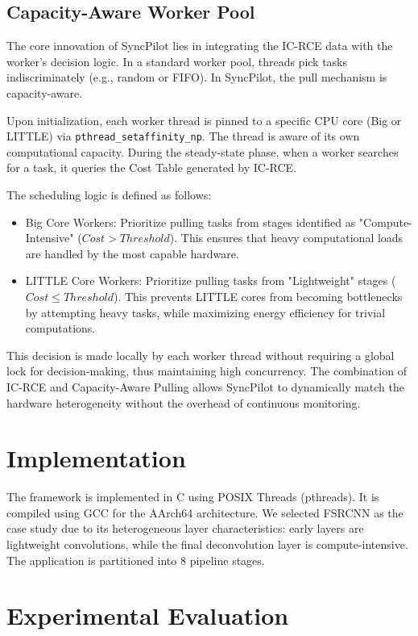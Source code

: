 \documentclass[conference]{IEEEtran}
\begin{document}
\subsection{Capacity-Aware Worker Pool}
The core innovation of SyncPilot lies in integrating the IC-RCE data with the worker's decision logic. In a standard worker pool, threads pick tasks indiscriminately (e.g., random or FIFO). In SyncPilot, the pull mechanism is capacity-aware.

Upon initialization, each worker thread is pinned to a specific CPU core (Big or LITTLE) via \texttt{pthread\_setaffinity\_np}. The thread is aware of its own computational capacity. During the steady-state phase, when a worker searches for a task, it queries the Cost Table generated by IC-RCE. 

The scheduling logic is defined as follows:
\begin{itemize}
    \item Big Core Workers: Prioritize pulling tasks from stages identified as "Compute-Intensive" ($Cost > Threshold$). This ensures that heavy computational loads are handled by the most capable hardware.
    \item LITTLE Core Workers: Prioritize pulling tasks from "Lightweight" stages ($Cost \le Threshold$). This prevents LITTLE cores from becoming bottlenecks by attempting heavy tasks, while maximizing energy efficiency for trivial computations.
\end{itemize}

This decision is made locally by each worker thread without requiring a global lock for decision-making, thus maintaining high concurrency. The combination of IC-RCE and Capacity-Aware Pulling allows SyncPilot to dynamically match the hardware heterogeneity without the overhead of continuous monitoring.

\section{Implementation}
The framework is implemented in C using POSIX Threads (pthreads). It is compiled using GCC for the AArch64 architecture. We selected FSRCNN as the case study due to its heterogeneous layer characteristics: early layers are lightweight convolutions, while the final deconvolution layer is compute-intensive. The application is partitioned into 8 pipeline stages.

\section{Experimental Evaluation}
\end{document}
